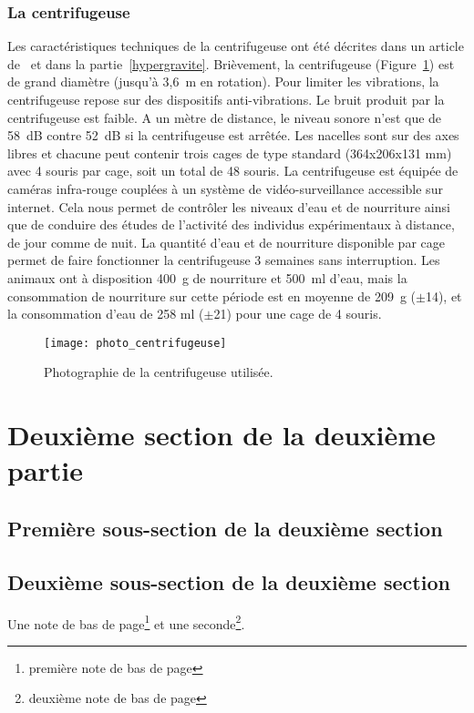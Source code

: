 \subsubsection{La centrifugeuse}
Les caractéristiques techniques de la centrifugeuse ont été décrites dans un article de~\cite{jamon_ground-based_2008} et dans la partie~\ref{hypergravite}. Brièvement, la centrifugeuse (Figure~\ref{photo_centrifugeuse}) est de grand diamètre (jusqu'à 3,6~m en rotation). Pour limiter les vibrations, la centrifugeuse repose sur des dispositifs anti-vibrations. Le bruit produit par la centrifugeuse est faible. A un mètre de distance, le niveau sonore n'est que de 58~dB contre 52~dB si la centrifugeuse est arrêtée. Les nacelles sont sur des axes libres et chacune peut contenir trois cages de type standard (364x206x131 mm) avec 4 souris par cage, soit un total de 48 souris. La centrifugeuse est équipée de caméras infra-rouge couplées à un système de vidéo-surveillance accessible sur internet. Cela nous permet de contrôler les niveaux d'eau et de nourriture ainsi que de conduire des études de l'activité des individus expérimentaux à distance, de jour comme de nuit. La quantité d'eau et de nourriture disponible par cage permet de faire fonctionner la centrifugeuse 3 semaines sans interruption. Les animaux ont à disposition 400~g de nourriture et 500~ml d'eau, mais la consommation de nourriture sur cette période est en moyenne de 209~g ($\pm$14), et la consommation d'eau de 258 ml ($\pm$21) pour une cage de 4 souris.
\begin{figure}[h!tbp]
\vspace{0.5cm}
\setcapindent{2em}
  \centering
  \texttt{[image: photo\_centrifugeuse]}
  \caption[Photographie de la centrifugeuse]{Photographie de la centrifugeuse utilisée.}
\label{photo_centrifugeuse}
\end{figure}
\lipsum[1]
\section{Deuxième section de la deuxième partie}
\lipsum[2]
\subsection{Première sous-section de la deuxième section}
\lipsum[101]
\subsection[Sous-sous section 2]{Deuxième sous-section de la deuxième section} %
Une note de bas de page\footnote{première note de bas de page} et une seconde\footnote{deuxième note de bas de page}.
